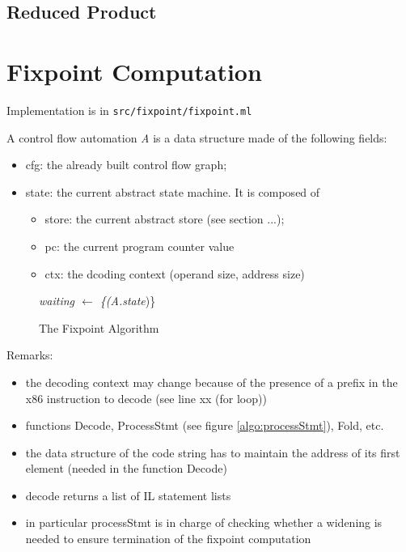 \documentclass{report}
\begin{document}
\section{Reduced Product}
\chapter{Fixpoint Computation}
Implementation is in \verb|src/fixpoint/fixpoint.ml|

A control flow automation \emph{A} is a data structure made of the following fields:
\begin{itemize}
\item cfg: the already built control flow graph;
\item state: the current abstract state machine. It is composed of 
  \begin{itemize}
  \item store: the current abstract store  (see
  section ...);
\item pc: the current program counter value
\item ctx: the dcoding context (operand size, address size)
\end{itemize}
\end{itemize}

\begin{figure}
\begin{algorithm}[H]

\BlankLine
\emph{waiting $\leftarrow$ \{(A.state})\}\;
\end{algorithm}
\caption{The Fixpoint Algorithm}
\end{figure}
Remarks:
  \begin{itemize}
\item the decoding context may change because of the presence of a
  prefix in the x86 instruction to decode (see line xx (for loop))
\item functions Decode, ProcessStmt (see figure \ref{algo:processStmt}), Fold, etc.
\item the data structure of the code string has to maintain the
  address of its first element (needed in the function Decode)
\item decode returns a list of IL statement lists
\item in particular processStmt is in charge of checking whether a
  widening is needed to ensure termination of the fixpoint computation
  \end{itemize}
\end{document}
